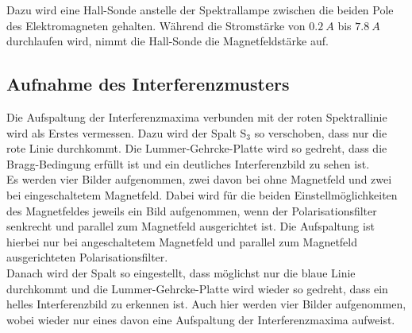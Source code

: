     Dazu wird eine Hall-Sonde anstelle der Spektrallampe zwischen die beiden Pole des Elektromagneten gehalten.
    Während die Stromstärke von $\SI{0,2}{A}$ bis $\SI{7,8}{A}$ durchlaufen wird, nimmt die Hall-Sonde die Magnetfeldstärke auf.

\subsection{Aufnahme des Interferenzmusters}
    Die Aufspaltung der Interferenzmaxima verbunden mit der roten Spektrallinie wird als Erstes vermessen.
    Dazu wird der Spalt S$_3$ so verschoben, dass nur die rote Linie durchkommt.
    Die Lummer-Gehrcke-Platte wird so gedreht, dass die Bragg-Bedingung erfüllt ist und ein deutliches Interferenzbild zu sehen ist.
    \\

    Es werden vier Bilder aufgenommen, zwei davon bei ohne Magnetfeld und zwei bei eingeschaltetem Magnetfeld.
    Dabei wird für die beiden Einstellmöglichkeiten des Magnetfeldes jeweils ein Bild aufgenommen, wenn der Polarisationsfilter senkrecht und parallel zum Magnetfeld ausgerichtet ist.
    Die Aufspaltung ist hierbei nur bei angeschaltetem Magnetfeld und parallel zum Magnetfeld ausgerichteten Polarisationsfilter.
    \\

    Danach wird der Spalt so eingestellt, dass möglichst nur die blaue Linie durchkommt und die Lummer-Gehrcke-Platte wird wieder so gedreht, dass ein helles Interferenzbild zu erkennen ist.
    Auch hier werden vier Bilder aufgenommen, wobei wieder nur eines davon eine Aufspaltung der Interferenzmaxima aufweist.
